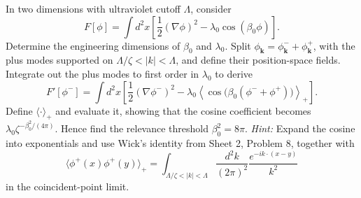 In two dimensions with ultraviolet cutoff $\Lambda$, consider
\begin{equation}
    F[\phi]=\int d^2x\left[
    \frac12(\nabla\phi)^2-\lambda_0\cos(\beta_0\phi)\right].
\end{equation}
Determine the engineering dimensions of $\beta_0$ and $\lambda_0$.
Split $\phi_\mathbf{k}=\phi_\mathbf{k}^-+\phi_\mathbf{k}^+$, with the plus modes supported on
$\Lambda/\zeta<|k|<\Lambda$, and define their position-space fields.
Integrate out the plus modes to first order in $\lambda_0$ to derive
\begin{equation}
    F'[\phi^-]=\int d^2x\left[
    \frac12(\nabla\phi^-)^2
    -\lambda_0\left\langle
    \cos\bigl(\beta_0(\phi^-+\phi^+)\bigr)
    \right\rangle_+\right].
\end{equation}
Define $\langle\cdot\rangle_+$ and evaluate it, showing that the
cosine coefficient becomes $\lambda_0\zeta^{-\beta_0^2/(4\pi)}$.
Hence find the relevance threshold $\beta_0^2=8\pi$.
\textit{Hint:} Expand the cosine into exponentials and use Wick's
identity from Sheet 2, Problem 8, together with
\begin{equation}
    \langle\phi^+(x)\phi^+(y)\rangle_+
    =\int_{\Lambda/\zeta<|k|<\Lambda}
    \frac{d^2k}{(2\pi)^2}\frac{e^{-ik\cdot(x-y)}}{k^2}
\end{equation}
in the coincident-point limit.

